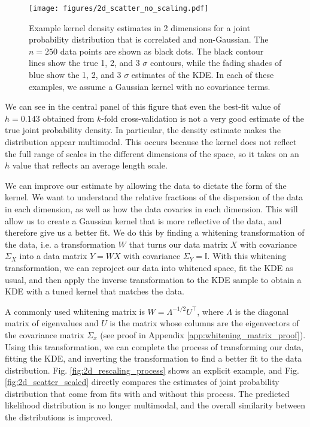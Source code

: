 \begin{figure}
    \centering
    \texttt{[image: figures/2d\_scatter\_no\_scaling.pdf]}
    \caption{Example kernel density estimates in 2 dimensions for a joint probability distribution that is correlated and non-Gaussian. The $n=250$ data points are shown as black dots. The black contour lines show the true 1, 2, and 3 $\sigma$ contours, while the fading shades of blue show the 1, 2, and 3 $\sigma$ estimates of the KDE. In each of these examples, we assume a Gaussian kernel with no covariance terms.}
    \label{fig:2d_scatter_unscaled}
\end{figure}

We can see in the central panel of this figure that even the best-fit value of $h=0.143$ obtained from $k$-fold cross-validation is not a very good estimate of the true joint probability density. In particular, the density estimate makes the distribution appear multimodal. This occurs because the kernel does not reflect the full range of scales in the different dimensions of the space, so it takes on an $h$ value that reflects an average length scale.

We can improve our estimate by allowing the data to dictate the form of the kernel. We want to understand the relative fractions of the dispersion of the data in each dimension, as well as how the data covaries in each dimension. This will allow us to create a Gaussian kernel that is more reflective of the data, and therefore give us a better fit. We do this by finding a whitening transformation of the data, i.e. a transformation $W$ that turns our data matrix $X$ with covariance $\Sigma_X$ into a data matrix $Y=WX$ with covariance $\Sigma_Y=\mathbb{I}$. With this whitening transformation, we can reproject our data into whitened space, fit the KDE as usual, and then apply the inverse transformation to the KDE sample to obtain a KDE with a tuned kernel that matches the data.

A commonly used whitening matrix is $W = \Lambda^{-1/2}U^\top$, where $\Lambda$ is the diagonal matrix of eigenvalues and $U$ is the matrix whose columns are the eigenvectors of the covariance matrix $\Sigma_x$ (see proof in Appendix \ref{app:whitening_matrix_proof}). Using this transformation, we can complete the process of transforming our data, fitting the KDE, and inverting the transformation to find a better fit to the data distribution. Fig. \ref{fig:2d_rescaling_process} shows an explicit example, and Fig. \ref{fig:2d_scatter_scaled} directly compares the estimates of joint probability distribution that come from fits with and without this process. The predicted likelihood distribution is no longer multimodal, and the overall similarity between the distributions is improved.

